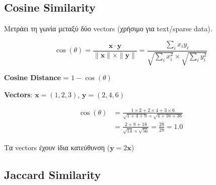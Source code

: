 \subsection{Cosine Similarity}

Μετράει τη γωνία μεταξύ δύο vectors (χρήσιμο για text/sparse data).

\begin{formulabox}
\begin{equation}
\cos(\theta) = \frac{\mathbf{x} \cdot \mathbf{y}}{\|\mathbf{x}\| \times \|\mathbf{y}\|} = \frac{\sum_i x_i y_i}{\sqrt{\sum_i x_i^2} \times \sqrt{\sum_i y_i^2}}
\end{equation}

\begin{center}
\end{center}

\textbf{Cosine Distance} = $1 - \cos(\theta)$
\end{formulabox}

\begin{examplebox}
\textbf{Vectors}: $\mathbf{x} = (1, 2, 3)$, $\mathbf{y} = (2, 4, 6)$

\begin{align*}
\cos(\theta) &= \frac{1 \times 2 + 2 \times 4 + 3 \times 6}{\sqrt{1+4+9} \times \sqrt{4+16+36}} \\
&= \frac{2 + 8 + 18}{\sqrt{14} \times \sqrt{56}} = \frac{28}{28} = \boxed{1.0}
\end{align*}

Τα vectors έχουν ίδια κατεύθυνση ($\mathbf{y} = 2\mathbf{x}$)
\end{examplebox}

\subsection{Jaccard Similarity}


